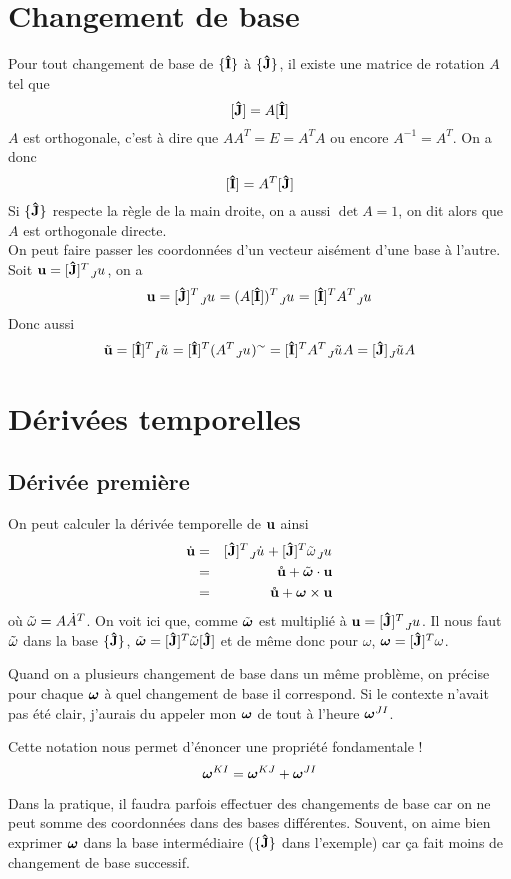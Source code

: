 \section{Changement de base}
Pour tout changement de base de $\{{\bf\hat{I}}\}$ à $\{{\bf\hat{J}}\}$, il existe une matrice de rotation $A$ tel que
\[ [{\bf\hat{J}}] = A [{\bf\hat{I}}] \]
$A$ est orthogonale, c'est à dire que $AA^T = E = A^TA$ ou encore $A^{-1} = A^T$.
On a donc
\[ [{\bf\hat{I}}] = A^T [{\bf\hat{J}}] \]
Si $\{{\bf\hat{J}}\}$ respecte la règle de la main droite, on a aussi $\det A = 1$, on dit alors que $A$ est orthogonale directe.\\
On peut faire passer les coordonnées d'un vecteur aisément d'une base à l'autre.
Soit $\fv{u} = [\uj]^T \wrt{J}{u}$, on a
\[ \fv{u} = [\uj]^T \wrt{J}{u} = (A[\ui])^T \wrt{J}{u} = [\ui]^TA^T \wrt{J}{u} \]
Donc aussi
\[ \tilde{\fv{u}} = [\ui]^T \wrt{I}{\tilde{u}} = [\ui]^T (A^T \wrt{J}{u})^{\sim} = [\ui]^T A^T \wrt{J}{\tilde{u}} A = [\uj] \wrt{J}{\tilde{u}} A \]

\section{Dérivées temporelles}

\subsection{Dérivée première}
On peut calculer la dérivée temporelle de ${\bf u}$ ainsi
\begin{eqnarray*}
	\fvd{u} &=& [\uj]^T \wrt{J}{\dot{u}} + [\uj]^T \omegat\wrt{J}{u}\\
	&=& \fvr{u} + \omegaft \cdot \fv{u}\\
	&=& \fvr{u} + \omegaf \times \fv{u}
\end{eqnarray*}
où $\tilde{\omega} = A\dot{A}^T$.
On voit ici que, comme $\tilde{\bm \omega}$ est multiplié à $\fv{u} = [\uj]^T \wrt{J}{u}$.
Il nous faut $\tilde{\omega}$ dans la base $\{{\bf\hat{J}}\}$, $\tilde{\bm \omega} = [{\bf\hat{J}}]^T \tilde{\omega} [{\bf\hat{J}}]$ et de même donc pour $\omega$, ${\bm \omega} = [{\bf\hat{J}}]^T \omega$.

Quand on a plusieurs changement de base dans un même problème, on précise pour chaque ${\bm \omega}$ à quel changement de base il correspond.
Si le contexte n'avait pas été clair, j'aurais du appeler mon ${\bm \omega}$ de tout à l'heure ${\bm \omega}^{JI}$.

Cette notation nous permet d'énoncer une propriété fondamentale !
\[ {\bm \omega}^{KI} = {\bm \omega}^{KJ} + {\bm \omega}^{JI} \]

Dans la pratique, il faudra parfois effectuer des changements de base car on ne peut somme des coordonnées dans des bases différentes.
Souvent, on aime bien exprimer ${\bm \omega}$ dans la base intermédiaire ($\{{\bf\hat{J}}\}$ dans l'exemple) car ça fait moins de changement de base successif.

